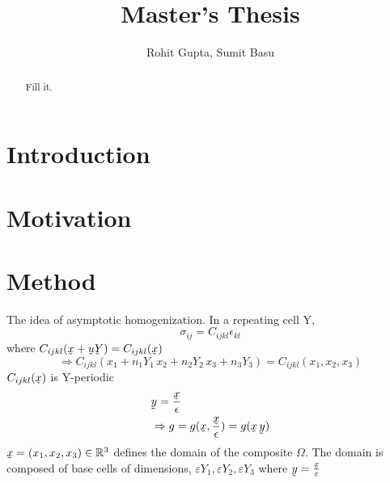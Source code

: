 \documentclass[10pt]{article}
\begin{document}
\title{Master's Thesis}
\author{Rohit Gupta, Sumit Basu}

\maketitle

\begin{abstract}
Fill it.
\end{abstract}

\section{Introduction}

\section{Motivation}

\section{Method}
The idea of asymptotic homogenization.
In a repeating cell Y,
\begin{equation}
	\label{First}
	\sigma_{ij} = C_{ijkl}\epsilon_{kl}	
\end{equation}
where $C_{ijkl}(\underaccent{\tilde}{x}+\underaccent{\tilde}{u}\underaccent{\tilde}{Y})=C_{ijkl}(\underaccent{\tilde}{x})$
\begin{equation}
\Rightarrow C_{ijkl}(x_1+n_1Y_1\, x_2+n_2Y_2\,x_3+n_3Y_3) = C_{ijkl}(x_1,x_2,x_3)
\end{equation}
$C_{ijkl}(\underaccent{\tilde}{x}) $ is Y-periodic\\
\begin{eqnarray}
&\underaccent{\tilde}{y} = \frac{\underaccent{\tilde}{x}}{\epsilon}\\
&\Rightarrow g = g(\underaccent{\tilde}{x},\frac{\underaccent{\tilde}{x}}{\epsilon}) = g(\underaccent{\tilde}{x} \,\underaccent{\tilde}{y})
\end{eqnarray}
$\underaccent{\tilde}{x} = (x_1, x_2, x_3) \in \mathbb{R}^3$ defines the domain of the composite $\Omega$. The domain is composed of base cells of dimensions, $\varepsilon Y_1 , \varepsilon Y_2,\varepsilon Y_3$ where $\underaccent{\tilde}{y}=\frac{\underaccent{\tilde}{x}}{\varepsilon}$
\end{document}

